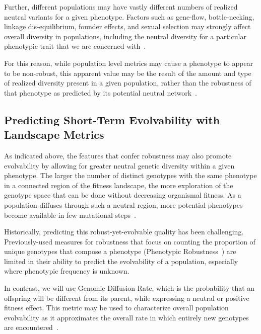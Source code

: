 \documentclass[PhD]{msu-thesis}
\begin{document}
Further, different populations may have vastly different numbers of realized neutral variants for a given phenotype. Factors such as gene-flow, bottle-necking, linkage dis-equilibrium, founder effects, and sexual selection may strongly affect overall diversity in populations, including the neutral diversity for a particular phenotypic trait that we are concerned with~\cite{alberch_genes_1991}.

For this reason, while population level metrics may cause a phenotype to appear to be non-robust, this apparent value may be the result of the amount and type of realized diversity present in a given population, rather than the robustness of that phenotype as predicted by its potential neutral network~\cite{alberch_genes_1991}. 

\subsection{Predicting Short-Term Evolvability with Landscape Metrics}

As indicated above, the features that confer robustness may also promote evolvability by allowing for greater neutral genetic diversity within a given phenotype. The larger the number of distinct genotypes with the same phenotype in a connected region of the fitness landscape, the more exploration of the genotype space that can be done without decreasing organismal fitness. As a population diffuses through such a neutral region, more potential phenotypes become available in few mutational steps~\cite{andreas_wagner_robustness_2005}.

Historically, predicting this robust-yet-evolvable quality has been challenging. Previously-used measures for robustness that focus on counting the proportion of unique genotypes that compose a phenotype (Phenotypic Robustness~\cite{andreas_wagner_robustness_2008}) are limited in their ability to predict the evolvability of a population, especially where phenotypic frequency is unknown. 

In contrast, we will use Genomic Diffusion Rate, which is the probability that an offspring will be different from its parent, while expressing a neutral or positive fitness effect. This metric may be used to characterize overall population evolvability as it approximates the overall rate in which entirely new genotypes are encountered~\cite{ofria_evolution_2002}. 
\end{document}
